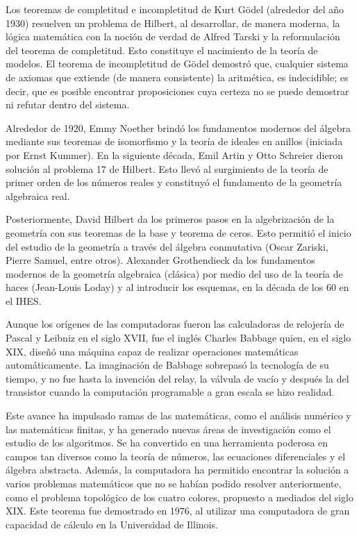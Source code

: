 Los teoremas de completitud e incompletitud de Kurt Gödel (alrededor del año 1930) resuelven un problema de Hilbert, al desarrollar, de manera moderna, la lógica matemática con la noción de verdad de Alfred Tarski y la reformulación del teorema de completitud. Esto constituye el nacimiento de la teoría de modelos. El teorema de incompletitud de Gödel demostró que, cualquier sistema de axiomas que extiende (de manera consistente) la aritmética, es indecidible; es decir, que es posible encontrar proposiciones cuya certeza no se puede demostrar ni refutar dentro
del sistema.

Alrededor de 1920, Emmy Noether brindó los fundamentos modernos del álgebra mediante sus teoremas de isomorfismo y la teoría de ideales en anillos (iniciada por Ernst Kummer). En la siguiente década, Emil Artin y Otto Schreier dieron solución al problema 17 de Hilbert. Esto llevó al surgimiento de la teoría de primer orden de los números reales y constituyó el fundamento de la
geometría algebraica real.

Posteriormente, David Hilbert da los primeros pasos en la algebrización de la geometría con sus teoremas de la base y teorema de ceros. Esto permitió el inicio del estudio de la geometría a través del álgebra conmutativa (Oscar Zariski, Pierre Samuel, entre otros). Alexander Grothendieck da los fundamentos modernos de la geometría algebraica (clásica) por medio del uso de la teoría de haces (Jean-Louis Loday) y al introducir los esquemas, en la década de los 60 en el IHES. 

Aunque los orígenes de las computadoras fueron las calculadoras de relojería de Pascal y Leibniz en el siglo XVII, fue el inglés Charles Babbage quien, en el siglo XIX, diseñó una máquina capaz de realizar operaciones matemáticas automáticamente. La imaginación de Babbage sobrepasó la tecnología de su tiempo, y no fue hasta la invención del relay, la válvula de vacío y después la del transistor cuando la computación programable a gran escala se hizo realidad. 

Este avance ha impulsado ramas de las matemáticas, como el análisis numérico y las matemáticas finitas, y ha generado nuevas áreas de investigación como el estudio de los algoritmos. Se ha convertido en una herramienta poderosa en campos tan diversos como la teoría de números, las ecuaciones diferenciales y el álgebra abstracta. Además, la computadora ha permitido encontrar la solución a varios problemas matemáticos que no se habían podido resolver anteriormente, como el problema topológico de los cuatro colores, propuesto a mediados del siglo XIX. Este teorema fue demostrado en 1976, al utilizar una computadora de gran capacidad de cálculo en la Universidad de Illinois. 

